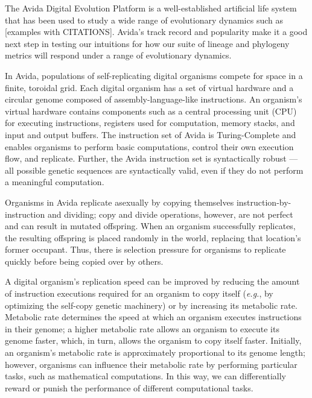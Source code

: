 \documentclass[letterpaper]{article}
\begin{document}


The Avida Digital Evolution Platform \citep{ofria_avida:_2004} is a well-established artificial life system that has been used to study a wide range of evolutionary dynamics such as [examples with CITATIONS].
Avida's track record and popularity make it a good next step in testing our intuitions for how our suite of lineage and phylogeny metrics will respond under a range of evolutionary dynamics.

In Avida, populations of self-replicating digital organisms compete for space in a finite, toroidal grid. 
Each digital organism has a set of virtual hardware and a circular genome composed of assembly-language-like instructions.
An organism's virtual hardware contains components such as a central processing unit (CPU) for executing instructions, registers used for computation, memory stacks, and input and output buffers. 
The instruction set of Avida is Turing-Complete and enables organisms to perform basic computations, control their own execution flow, and replicate. 
Further, the Avida instruction set is syntactically robust --- all possible genetic sequences are syntactically valid, even if they do not perform a meaningful computation.

Organisms in Avida replicate asexually by copying themselves instruction-by-instruction and dividing; copy and divide operations, however, are not perfect and can result in mutated offspring.
When an organism successfully replicates, the resulting offspring is placed randomly in the world, replacing that location's former occupant.
Thus, there is selection pressure for organisms to replicate quickly before being copied over by others.

A digital organism's replication speed can be improved by reducing the amount of instruction executions required for an organism to copy itself (\textit{e.g.}, by optimizing the self-copy genetic machinery) or by increasing its metabolic rate. Metabolic rate determines the speed at which an organism executes instructions in their genome; a higher metabolic rate allows an organism to execute its genome faster, which, in turn, allows the organism to copy itself faster. 
Initially, an organism's metabolic rate is approximately proportional
to its genome length; however, organisms can influence their metabolic rate by performing particular tasks, such as mathematical computations.
In this way, we can differentially reward or punish the performance of different computational tasks.
\end{document}
